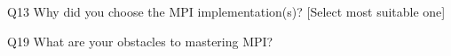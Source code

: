 \begin{description}%
\item{Q13} Why did you choose the MPI implementation(s)? [Select most suitable one]%
\item{Q19} What are your obstacles to mastering MPI?%
\end{description}%
